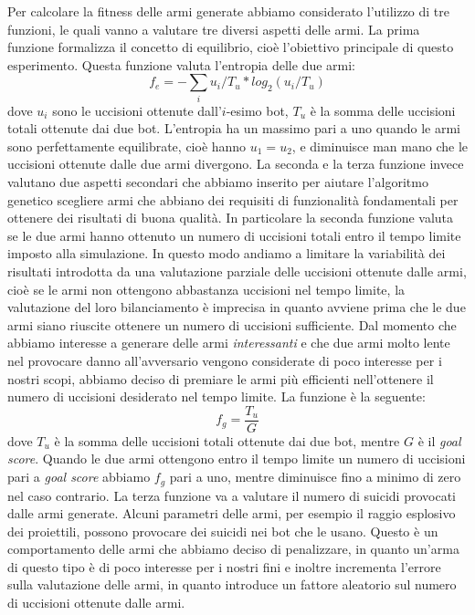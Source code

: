 \documentclass[12pt, italian]{toptesi}
\begin{document}
Per calcolare la fitness delle armi generate abbiamo considerato l'utilizzo di tre funzioni, le quali vanno a valutare tre diversi aspetti delle armi.
La prima funzione formalizza il concetto di equilibrio, cioè l'obiettivo principale di questo esperimento.
Questa funzione valuta l'entropia delle due armi:
\begin{equation}
f_e = - \sum_i u_i/T_u*log_2(u_i/T_u)
\end{equation}
dove $u_i$ sono le uccisioni ottenute dall'$i$-esimo bot, $T_u$ è la somma delle uccisioni totali ottenute dai due bot.
L'entropia ha un massimo pari a uno quando le armi sono perfettamente equilibrate, cioè hanno $u_1 = u_2$, e diminuisce man mano che le uccisioni ottenute dalle due armi divergono.
La seconda e la terza funzione invece valutano due aspetti secondari che abbiamo inserito per aiutare l'algoritmo genetico scegliere armi che abbiano dei requisiti di funzionalità fondamentali per ottenere dei risultati di buona qualità.
In particolare la seconda funzione valuta se le due armi hanno ottenuto un numero di uccisioni totali entro il tempo limite imposto alla simulazione. In questo modo andiamo a limitare la variabilità dei risultati introdotta da una valutazione parziale delle uccisioni ottenute dalle armi, cioè se le armi non ottengono abbastanza uccisioni nel tempo limite, la valutazione del loro bilanciamento è imprecisa in quanto avviene prima che le due armi siano riuscite ottenere un numero di uccisioni sufficiente.
Dal momento che abbiamo interesse a generare delle armi \emph{interessanti} e che due armi molto lente nel provocare danno all'avversario vengono considerate di poco interesse per i nostri scopi, abbiamo deciso di premiare le armi più efficienti nell'ottenere il numero di uccisioni desiderato nel tempo limite.
La funzione è la seguente:
\begin{equation}
f_g =  \frac{T_u}{G}
\end{equation}
dove $T_u$ è la somma delle uccisioni totali ottenute dai due bot, mentre $G$ è il \emph{goal score}. Quando le due armi ottengono entro il tempo limite un numero di uccisioni pari a \emph{goal score} abbiamo $f_g$ pari a uno, mentre diminuisce fino a minimo di zero nel caso contrario.
La terza funzione va a valutare il numero di suicidi provocati dalle armi generate. Alcuni parametri delle armi, per esempio il raggio esplosivo dei proiettili, possono provocare dei suicidi nei bot che le usano. Questo è un comportamento delle armi che abbiamo deciso di penalizzare, in quanto un'arma di questo tipo è di poco interesse per i nostri fini e inoltre incrementa l'errore sulla valutazione delle armi, in quanto introduce un fattore aleatorio sul numero di uccisioni ottenute dalle armi.
\end{document}
